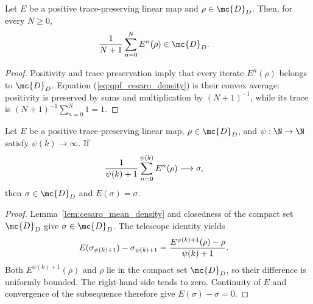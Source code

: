 \begin{lemma}
    \label{lem:cesaro_mean_density}
    \leanok
    Let $E$ be a positive trace-preserving linear map and
    $\rho\in\mc{D}_D$. Then, for every $N\geq0$,
    \begin{align}
        \frac{1}{N+1}\sum_{n=0}^{N}E^n(\rho)
         & \in\mc{D}_D.
        \label{eq:qpf_cesaro_density}
    \end{align}
\end{lemma}

\begin{proof}\leanok
    Positivity and trace preservation imply that every iterate
    $E^n(\rho)$ belongs to $\mc{D}_D$. Equation
    (\ref{eq:qpf_cesaro_density}) is their convex average: positivity is
    preserved by sums and multiplication by $(N+1)^{-1}$, while its trace is
    $(N+1)^{-1}\sum_{n=0}^{N}1=1$.
\end{proof}

\begin{lemma}
    \label{lem:cesaro_subseq_fixed}
    \leanok
    Let $E$ be a positive trace-preserving linear map,
    $\rho\in\mc{D}_D$, and
    $\psi:\N\to\N$ satisfy $\psi(k)\to\infty$. If
    \begin{align}
        \frac{1}{\psi(k)+1}\sum_{n=0}^{\psi(k)}E^n(\rho)
         & \longrightarrow\sigma,
        \notag
    \end{align}
    then $\sigma\in\mc{D}_D$ and $E(\sigma)=\sigma$.
\end{lemma}

\begin{proof}\leanok
    Lemma~\ref{lem:cesaro_mean_density} and closedness of the compact set
    $\mc{D}_D$ give $\sigma\in\mc{D}_D$. The telescope identity yields
    \begin{align}
        E(\sigma_{\psi(k)+1})-\sigma_{\psi(k)+1}
         & =\frac{E^{\psi(k)+1}(\rho)-\rho}{\psi(k)+1}.
        \notag
    \end{align}
    Both $E^{\psi(k)+1}(\rho)$ and $\rho$ lie in the compact set
    $\mc{D}_D$, so their difference is uniformly bounded. The right-hand
    side tends to zero. Continuity of $E$ and convergence of the subsequence
    therefore give $E(\sigma)-\sigma=0$.
\end{proof}

